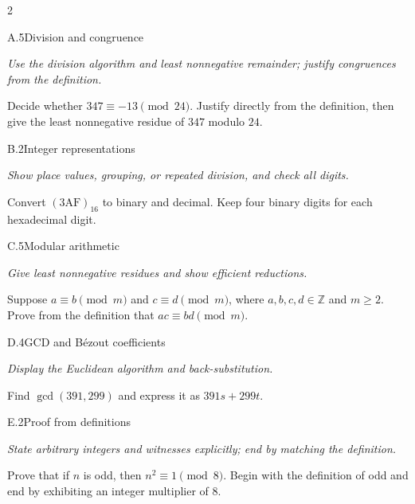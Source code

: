 \documentclass[9pt]{extarticle}
\begin{document}
\begin{multicols}{2}
\begin{CoreProblem}{A.5}{Division and congruence}
{\scriptsize\textit{Use the division algorithm and least nonnegative remainder; justify congruences from the definition.}\par}
Decide whether $347\equiv-13\pmod{24}$. Justify directly from the definition,
then give the least nonnegative residue of $347$ modulo $24$.
\end{CoreProblem}
\begin{CoreProblem}{B.2}{Integer representations}
{\scriptsize\textit{Show place values, grouping, or repeated division, and check all digits.}\par}
Convert $(\mathrm{3AF})_{16}$ to binary and decimal. Keep four binary digits
for each hexadecimal digit.
\end{CoreProblem}
\begin{CoreProblem}{C.5}{Modular arithmetic}
{\scriptsize\textit{Give least nonnegative residues and show efficient reductions.}\par}
Suppose $a\equiv b\pmod m$ and $c\equiv d\pmod m$, where
$a,b,c,d\in\mathbb Z$ and $m\ge2$. Prove from the definition that
$ac\equiv bd\pmod m$.
\end{CoreProblem}
\columnbreak
\begin{CoreProblem}{D.4}{GCD and B\'ezout coefficients}
{\scriptsize\textit{Display the Euclidean algorithm and back-substitution.}\par}
Find $\gcd(391,299)$ and express it as $391s+299t$.
\end{CoreProblem}
\begin{CoreProblem}{E.2}{Proof from definitions}
{\scriptsize\textit{State arbitrary integers and witnesses explicitly; end by matching the definition.}\par}
Prove that if $n$ is odd, then $n^2\equiv1\pmod{8}$. Begin with the definition
of odd and end by exhibiting an integer multiplier of $8$.
\end{CoreProblem}
\end{multicols}
\CoreWorkArea
\FormBreak
{}
\end{document}
